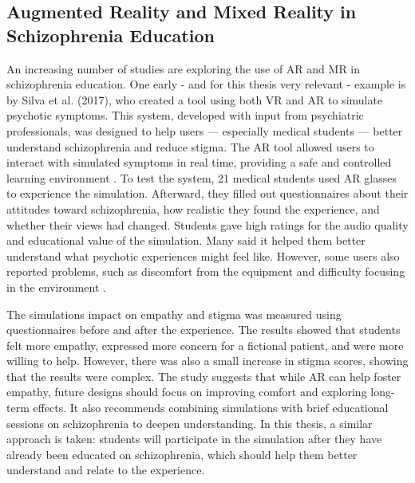 \subsection{Augmented Reality and Mixed Reality in Schizophrenia Education}

An increasing number of studies are exploring the use of AR and MR in schizophrenia education. One early - and for this thesis very relevant - example is by Silva et al. (2017), who created a tool using both VR and AR to simulate psychotic symptoms. This system, developed with input from psychiatric professionals, was designed to help users — especially medical students — better understand schizophrenia and reduce stigma. The AR tool allowed users to interact with simulated symptoms in real time, providing a safe and controlled learning environment \cite{Silva2017}. To test the system, 21 medical students used AR glasses to experience the simulation. Afterward, they filled out questionnaires about their attitudes toward schizophrenia, how realistic they found the experience, and whether their views had changed. Students gave high ratings for the audio quality and educational value of the simulation. Many said it helped them better understand what psychotic experiences might feel like. However, some users also reported problems, such as discomfort from the equipment and difficulty focusing in the environment \cite{Silva2017}.

The simulations impact on empathy and stigma was measured using questionnaires before and after the experience. The results showed that students felt more empathy, expressed more concern for a fictional patient, and were more willing to help. However, there was also a small increase in stigma scores, showing that the results were complex. The study suggests that while AR can help foster empathy, future designs should focus on improving comfort and exploring long-term effects. It also recommends combining simulations with brief educational sessions on schizophrenia to deepen understanding. In this thesis, a similar approach is taken: students will participate in the simulation after they have already been educated on schizophrenia, which should help them better understand and relate to the experience.

